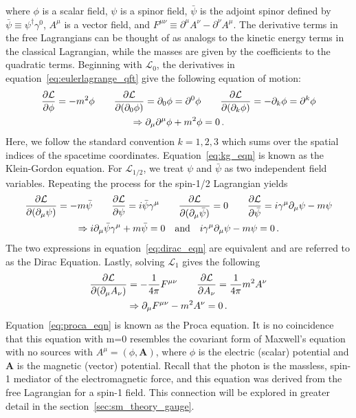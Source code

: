 where $\phi$ is a scalar field, $\psi$ is a spinor field, $\bar{\psi}$ is the adjoint spinor defined by $\bar{\psi}\equiv\psi^\dagger\gamma^0$, $A^\mu$ is a vector field, and $F^{\mu\nu}\equiv\partial^\mu A^\nu-\partial^\nu A^\mu$. The derivative terms in the free Lagrangians can be thought of as analogs to the kinetic energy terms in the classical Lagrangian, while the masses are given by the coefficients to the quadratic terms. Beginning with $\mathcal{L}_0$, the derivatives in equation~\ref{eq:eulerlagrange_qft} give the following equation of motion:
\begin{gather}
	\pdv{\mathcal{L}}{\phi}=-m^2\phi \qquad
	\pdv{\mathcal{L}}{(\partial_0\phi)}=\partial_0\phi=\partial^0\phi \qquad
	\pdv{\mathcal{L}}{(\partial_k\phi)}=-\partial_k\phi=\partial^k\phi	\\
	\Rightarrow \partial_\mu\partial^\mu\phi+m^2\phi=0 \,.\label{eq:kg_eqn}
\end{gather}
Here, we follow the standard convention $k=1,2,3$ which sums over the spatial indices of the spacetime coordinates. Equation~\ref{eq:kg_eqn} is known as the Klein-Gordon equation. For $\mathcal{L}_{1/2}$, we treat $\psi$ and $\bar{\psi}$ as two independent field variables. Repeating the process for the spin-1/2 Lagrangian yields
\begin{gather}
	\pdv{\mathcal{L}}{(\partial_\mu\psi)}=-m\bar{\psi} \qquad \pdv{\mathcal{L}}{\psi}=i\bar{\psi}\gamma^\mu \qquad
	\pdv{\mathcal{L}}{(\partial_\mu\bar{\psi})}=0 \qquad
	\pdv{\mathcal{L}}{\bar{\psi}}=i\gamma^\mu\partial_\mu\psi-m\psi	\\
	\Rightarrow i\partial_\mu\bar{\psi}\gamma^\mu+m\bar{\psi}=0 \quad \text{and} \quad i\gamma^\mu\partial_\mu\psi-m\psi=0\,. \label{eq:dirac_eqn}
\end{gather}
The two expressions in equation~\ref{eq:dirac_eqn} are equivalent and are referred to as the Dirac Equation. Lastly, solving $\mathcal{L}_1$ gives the following
\begin{gather}
	\pdv{\mathcal{L}}{(\partial_\mu A_\nu)}=-\frac{1}{4\pi}F^{\mu\nu} \qquad \pdv{\mathcal{L}}{A_\nu}=\frac{1}{4\pi}m^2A^\nu \\
	\Rightarrow \partial_\mu F^{\mu\nu}-m^2A^\nu=0\,. \label{eq:proca_eqn}
\end{gather}
Equation~\ref{eq:proca_eqn} is known as the Proca equation. It is no coincidence that this equation with m=0 resembles the covariant form of Maxwell's equation with no sources with $A^\mu=(\phi, \mathbf{A})$, where $\phi$ is the electric (scalar) potential and $\mathbf{A}$ is the magnetic (vector) potential. Recall that the photon is the massless, spin-1 mediator of the electromagnetic force, and this equation was derived from the free Lagrangian for a spin-1 field. This connection will be explored in greater detail in the section~\ref{sec:sm_theory_gauge}.

